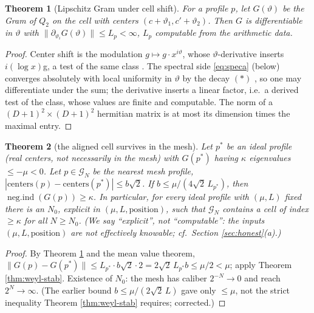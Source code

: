 \documentclass[11pt,reqno]{amsart}
\newtheorem{theorem}{Theorem}[section]
\theoremstyle{definition}
\newcommand{\negind}{\operatorname{neg.ind}}
\begin{document}
\begin{theorem}[Lipschitz Gram under cell shift]\label{thm:lipschitz}
For a profile \(p\), let \(G(\vartheta)\) be the Gram of \(Q_2\) on the cell
with centers \((c+\vartheta_1,c'+\vartheta_2)\). Then \(G\) is differentiable in
\(\vartheta\) with \(\|\partial_{\vartheta_i}G(\vartheta)\|\leq L_p<\infty\),
\(L_p\) computable from the arithmetic data.
\end{theorem}

\begin{proof}
Center shift is the modulation \(g\mapsto g\cdot x^{i\vartheta}\), whose
\(\vartheta\)-derivative inserts \(i(\log x)\)g, a test of the same class
\cite{P40}. The spectral side \eqref{eq:speca} (below) converges absolutely with
local uniformity in \(\vartheta\) by the decay \((\ast)\) \cite{P40}, so one may
differentiate under the sum; the derivative inserts a linear factor, i.e.\ a
derived test of the class, whose values are finite and computable. The norm of a
\((D+1)^2\times(D+1)^2\) hermitian matrix is at most its dimension times the
maximal entry.
\end{proof}

\begin{theorem}[the aligned cell survives in the mesh]\label{thm:mesh}
Let \(p^*\) be an ideal profile (real centers, not necessarily in the mesh) with
\(G(p^*)\) having \(\kappa\) eigenvalues \(\leq-\mu<0\). Let \(p\in\mathcal G_N\)
be the nearest mesh profile, \(|\mathrm{centers}(p)-\mathrm{centers}(p^*)|\leq
b\sqrt2\). If \(b\leq\mu/(4\sqrt2\,L_{p^*})\), then \(\negind(G(p))\geq\kappa\).
In particular, for every ideal profile with \((\mu,L)\) fixed there is an
\(N_0\), explicit in \((\mu,L,\mathrm{position})\), such that \(\mathcal G_N\)
contains a cell of index \(\geq\kappa\) for all \(N\geq N_0\). \textup{(}We say
``explicit'', not ``computable'': the inputs \((\mu,L,\mathrm{position})\) are
not effectively knowable; cf.\ Section \ref{sec:honest}\textup{(a)}.\textup{)}
\end{theorem}

\begin{proof}
By Theorem \ref{thm:lipschitz} and the mean value theorem,
\(\|G(p)-G(p^*)\|\leq L_{p^*}\cdot b\sqrt2\cdot2=2\sqrt2\,L_{p^*}b\leq\mu/2<\mu\);
apply Theorem \ref{thm:weyl-stab}. Existence of \(N_0\): the mesh has caliber
\(2^{-N}\to0\) and reach \(2^N\to\infty\). \textup{(}The earlier bound
\(b\leq\mu/(2\sqrt2\,L)\) gave only \(\leq\mu\), not the strict inequality
Theorem \ref{thm:weyl-stab} requires; corrected.\textup{)}
\end{proof}
\end{document}
